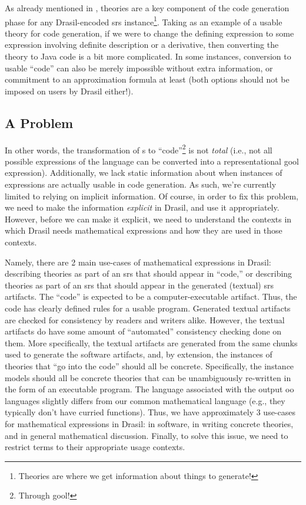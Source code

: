 \pseudoExampleExpression{}

As already mentioned in , theories are a key component of
the code generation phase for any Drasil-encoded \acs{srs}
instance\footnote{Theories are where we get information about things to
generate!}. Taking  as an example of a usable theory
for code generation, if we were to change the defining expression to some
expression involving definite description or a derivative, then converting the
theory to Java code is a bit more complicated. In some instances, conversion to
usable ``code'' can also be merely impossible without extra information, or
commitment to an approximation formula at least (both options should not be
imposed on users by Drasil either!).

\subsection{A Problem}
\label{chap:lang-division:sec:a-mathematical-language:subsec:a-problem}

In other words, the transformation of \Expr{}s to ``code''\footnote{Through
\acs{gool}!} is not \textit{total} (i.e., not all possible expressions of the
\Expr{} language can be converted into a representational \acs{gool}
expression). Additionally, we lack static information about when instances of
expressions are actually usable in code generation. As such, we're currently
limited to relying on implicit information. Of course, in order to fix this
problem, we need to make the information \textit{explicit} in Drasil, and use it
appropriately. However, before we can make it explicit, we need to understand
the contexts in which Drasil needs mathematical expressions and how they are
used in those contexts.

Namely, there are 2 main use-cases of mathematical expressions in Drasil:
describing theories as part of an \acs{srs} that should appear in ``code,'' or
describing theories as part of an \acs{srs} that should appear in the generated
(textual) \acs{srs} artifacts. The ``code'' is expected to be a
computer-executable artifact. Thus, the code has clearly defined rules for a
usable program. Generated textual artifacts are checked for consistency by
readers and writers alike. However, the textual artifacts do have some amount of
``automated'' consistency checking done on them. More specifically, the textual
artifacts are generated from the same chunks used to generate the software
artifacts, and, by extension, the instances of theories that ``go into the
code'' should all be concrete. Specifically, the instance models should all be
concrete theories that can be unambiguously re-written in the form of an
executable program. The language associated with the output \acs{oo} languages
slightly differs from our common mathematical language (e.g., they typically
don't have curried functions). Thus, we have approximately 3 use-cases for
mathematical expressions in Drasil: in software, in writing concrete theories,
and in general mathematical discussion. Finally, to solve this issue, we need to
restrict terms to their appropriate usage contexts.

